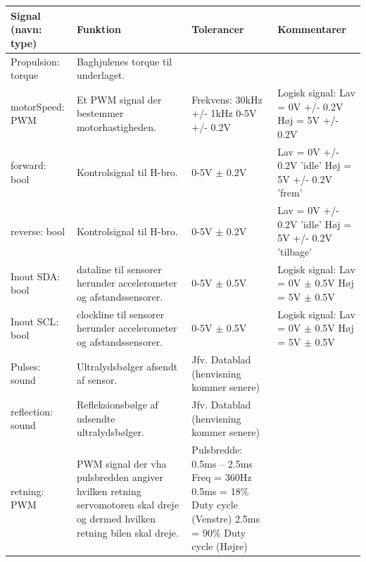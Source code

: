 \begin{table}[h]
	\centering
	\begin{tabularx}{\textwidth}{|l|Z|Z|Z|} \hline
	\textbf{Signal (navn: type)} & \textbf{Funktion} & \textbf{Tolerancer} & \textbf{Kommentarer} \\ \hline

Propulsion: torque
	& Baghjulenes torque til underlaget.
	& ~
	& ~
	\\ \hline

motorSpeed: PWM
	& Et PWM signal der bestemmer motorhastigheden. 
	& Frekvens: 30kHz +/- 1kHz 0-5V +/- 0.2V
 	& Logisk signal: \newline
		Lav = 0V +/- 0.2V \newline
		Høj = 5V +/- 0.2V
	\\ \hline

forward: bool
	& Kontrolsignal til H-bro.
	& 0-5V $\pm$ 0.2V
	& Lav = 0V +/- 0.2V  ’idle’ \newline
		Høj =  5V +/- 0.2V  ’frem’
	\\ \hline
	
reverse: bool
	& Kontrolsignal til H-bro.
	& 0-5V $\pm$ 0.2V
	& Lav = 0V +/- 0.2V ’idle’ \newline
		Høj =  5V +/- 0.2V  ’tilbage’
	\\ \hline
	
Inout SDA: bool
	& \IIC dataline til sensorer herunder accelerometer og afstandssensorer. 
	& 0-5V $\pm$ 0.5V
 	& Logisk signal: \newline
		Lav = 0V $\pm$ 0.5V \newline
		Høj = 5V $\pm$ 0.5V
	\\ \hline

Inout SCL: bool
	& \IIC clockline  til sensorer herunder accelerometer og afstandssensorer. 
	& 0-5V $\pm$ 0.5V
 	& Logisk signal: \newline
		Lav = 0V $\pm$ 0.5V \newline
		Høj = 5V $\pm$ 0.5V
	\\ \hline

Pulses: sound
	& Ultralydsbølger afsendt af sensor. 
	& Jfv. Datablad (henvisning kommer senere) %
 	& ~
	\\ \hline
	
reflection: sound
	& Refleksionsbølge af udsendte ultralydsbølger. 
	& Jfv. Datablad (henvisning kommer senere) %
 	& ~
	\\ \hline
	
retning: PWM 
	& PWM signal der vha pulsbredden angiver hvilken retning servomotoren skal 				dreje og dermed hvilken retning bilen skal dreje. 
	& Pulsbredde: 0.5ms – 2.5ms \newline
		Freq = 360Hz \newline
		0.5ms = 18\% Duty cycle (Venstre)\newline
		2.5ms = 90\% Duty cycle (Højre)
	& ~
	\\ \hline


\end{tabularx}
\end{table}
